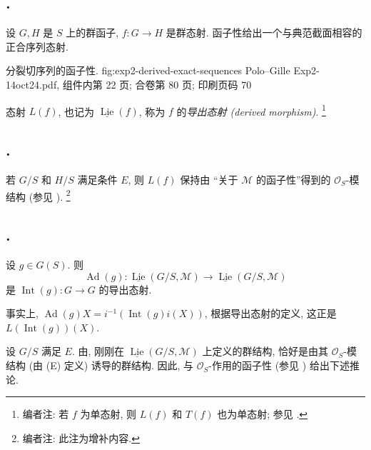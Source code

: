 \subsection*{.}
设 \(G,H\) 是 \(S\) 上的群函子, \(f:G\to H\) 是群态射.
函子性给出一个与典范截面相容的正合序列态射.

  {分裂切序列的函子性.}
  {fig:exp2-derived-exact-sequences}
  {Polo--Gille Exp2-14oct24.pdf, 组件内第 22 页; 合卷第 80 页; 印刷页码 70}

态射 \(L(f)\), 也记为 \(\underline{\operatorname{Lie}}(f)\),
称为 \(f\) 的\emph{导出态射 (derived morphism)}.
\footnote{编者注: 若 \(f\) 为单态射, 则 \(L(f)\) 和 \(T(f)\) 也为单态射;
参见 .}

\subsection*{.}
若 \(G/S\) 和 \(H/S\) 满足条件 \(E\), 则 \(L(f)\) 保持由
“关于 \(\mathcal M\) 的函子性”得到的 \(\mathcal O_S\)-模结构
(参见 ).
\footnote{编者注: 此注为增补内容.}

\subsection*{.}
设 \(g\in G(S)\). 则
\[
  \operatorname{Ad}(g):
  \underline{\operatorname{Lie}}(G/S,\mathcal M)
  \longrightarrow
  \underline{\operatorname{Lie}}(G/S,\mathcal M)
\]
是 \(\operatorname{Int}(g):G\to G\) 的导出态射.

事实上, \(\operatorname{Ad}(g)X=i^{-1}(\operatorname{Int}(g)i(X))\),
根据导出态射的定义, 这正是 \(L(\operatorname{Int}(g))(X)\).

设 \(G/S\) 满足 \(E\). 由,
刚刚在 \(\underline{\operatorname{Lie}}(G/S,\mathcal M)\) 上定义的群结构,
恰好是由其 \(\mathcal O_S\)-模结构 (由 (E) 定义) 诱导的群结构.
因此,  与
\(\mathcal O_S\)-作用的函子性 (参见 )
给出下述推论.

